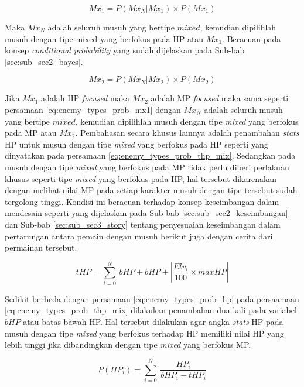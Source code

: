 \begin{equation}\label{eq:enemy_types_prob_mx1}
Mx_{1} = P(Mx_{{N}}|Mx_{1}) \times P(Mx_{1})
\end{equation}

Maka $Mx_{N}$ adalah seluruh musuh yang bertipe $mixed$, kemudian dipilihlah musuh dengan tipe mixed yang berfokus pada HP atau $Mx_{1}$. Beracuan pada konsep \textit{conditional probability} yang sudah dijelaskan pada Sub-bab \ref{sec:sub_sec2_bayes}.

\begin{equation}\label{eq:enemy_types_prob_mx2}
Mx_{2} = P(Mx_{{N}}|Mx_{2}) \times P(Mx_{2})
\end{equation}

Jika $Mx_{1}$ adalah HP \textit{focused} maka  $Mx_{2}$ adalah MP \textit{focused} maka sama seperti persamaan \ref{eq:enemy_types_prob_mx1} dengan $Mx_{N}$ adalah seluruh musuh yang bertipe $mixed$, kemudian dipilihlah musuh dengan tipe \textit{mixed} yang berfokus pada MP atau $Mx_{2}$. Pembahasan secara khusus lainnya adalah penambahan \textit{stats} HP untuk musuh dengan tipe \textit{mixed} yang berfokus pada HP seperti yang dinyatakan pada persamaan \ref{eq:enemy_types_prob_thp_mix}. Sedangkan pada musuh dengan tipe \textit{mixed} yang berfokus pada MP tidak perlu diberi perlakuan khusus seperti tipe \textit{mixed} yang berfokus pada HP, hal tersebut dikarenakan dengan melihat nilai MP pada setiap karakter musuh dengan tipe tersebut sudah tergolong tinggi. Kondisi ini beracuan terhadap konsep keseimbangan dalam mendesain seperti yang dijelaskan pada Sub-bab \ref{sec:sub_sec2_keseimbangan} dan Sub-bab \ref{sec:sub_sec3_story} tentang penyesuaian keseimbangan dalam pertarungan antara pemain dengan musuh berikut juga dengan cerita dari permainan tersebut.

\begin{equation}\label{eq:enemy_types_prob_thp_mix}
tHP = \sum_{i=0}^{N}\ bHP + bHP + \left | \frac{Elv_{i}}{100} \times maxHP \right |
\end{equation}

Sedikit berbeda dengan persamaan \ref{eq:enemy_types_prob_hp} pada persaamaan \ref{eq:enemy_types_prob_thp_mix} dilakukan penambahan dua kali pada variabel $bHP$ atau batas bawah HP. Hal tersebut dilakukan agar angka \textit{stats} HP pada musuh dengan tipe \textit{mixed} yang berfokus terhadap HP memiliki nilai HP yang lebih tinggi jika dibandingkan dengan tipe \textit{mixed} yang berfokus MP.

\begin{equation}\label{eq:enemy_types_prob_hp_mix}
P(HP_{i}) = \sum_{i=0}^{N}\ \frac{HP_{i}}{bHP_{i} - tHP_{i}}
\end{equation}

